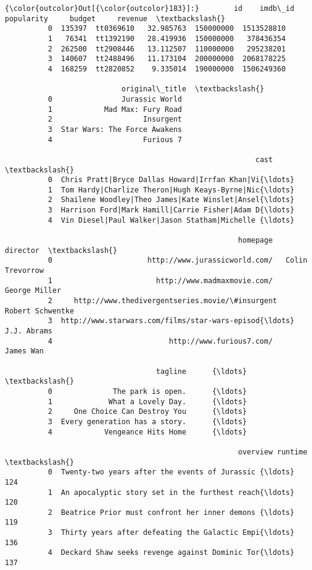 \documentclass[11pt]{article}
\begin{document}
\begin{Verbatim}[commandchars=\\\{\}]
{\color{outcolor}Out[{\color{outcolor}183}]:}        id    imdb\_id  popularity     budget     revenue  \textbackslash{}
          0  135397  tt0369610   32.985763  150000000  1513528810   
          1   76341  tt1392190   28.419936  150000000   378436354   
          2  262500  tt2908446   13.112507  110000000   295238201   
          3  140607  tt2488496   11.173104  200000000  2068178225   
          4  168259  tt2820852    9.335014  190000000  1506249360   
          
                           original\_title  \textbackslash{}
          0                Jurassic World   
          1            Mad Max: Fury Road   
          2                     Insurgent   
          3  Star Wars: The Force Awakens   
          4                     Furious 7   
          
                                                          cast  \textbackslash{}
          0  Chris Pratt|Bryce Dallas Howard|Irrfan Khan|Vi{\ldots}   
          1  Tom Hardy|Charlize Theron|Hugh Keays-Byrne|Nic{\ldots}   
          2  Shailene Woodley|Theo James|Kate Winslet|Ansel{\ldots}   
          3  Harrison Ford|Mark Hamill|Carrie Fisher|Adam D{\ldots}   
          4  Vin Diesel|Paul Walker|Jason Statham|Michelle {\ldots}   
          
                                                      homepage          director  \textbackslash{}
          0                      http://www.jurassicworld.com/   Colin Trevorrow   
          1                        http://www.madmaxmovie.com/     George Miller   
          2     http://www.thedivergentseries.movie/\#insurgent  Robert Schwentke   
          3  http://www.starwars.com/films/star-wars-episod{\ldots}       J.J. Abrams   
          4                           http://www.furious7.com/         James Wan   
          
                                   tagline      {\ldots}       \textbackslash{}
          0              The park is open.      {\ldots}        
          1             What a Lovely Day.      {\ldots}        
          2     One Choice Can Destroy You      {\ldots}        
          3  Every generation has a story.      {\ldots}        
          4            Vengeance Hits Home      {\ldots}        
          
                                                      overview runtime  \textbackslash{}
          0  Twenty-two years after the events of Jurassic {\ldots}     124   
          1  An apocalyptic story set in the furthest reach{\ldots}     120   
          2  Beatrice Prior must confront her inner demons {\ldots}     119   
          3  Thirty years after defeating the Galactic Empi{\ldots}     136   
          4  Deckard Shaw seeks revenge against Dominic Tor{\ldots}     137   
          

\end{Verbatim}
\end{document}
